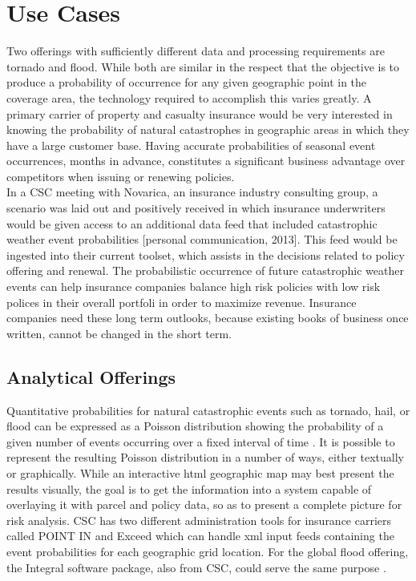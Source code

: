 \section{Use Cases}
Two offerings with sufficiently different data and processing requirements are tornado and flood. While both are similar in the respect that the objective is to produce a probability of occurrence for any given geographic point in the coverage area, the technology required to accomplish this varies greatly. A primary carrier of property and casualty insurance would be very interested in knowing the probability of natural catastrophes in geographic areas in which they have a large customer base. Having accurate probabilities of seasonal event occurrences, months in advance, constitutes a significant business advantage over competitors when issuing or renewing policies.\\

In a \textsc{CSC} meeting with Novarica, an insurance industry consulting group, a scenario was laid out and positively received in which insurance underwriters would be given access to an additional data feed that included catastrophic weather event probabilities [personal communication, 2013]. This feed would be ingested into their current toolset, which assists in the decisions related to policy offering and renewal. The probabilistic occurrence of future catastrophic weather events can help insurance companies balance high risk policies with low risk polices in their overall portfoli in order to maximize revenue. Insurance companies need these long term outlooks, because existing books of business once written, cannot be changed in the short term.
\subsection{Analytical Offerings}
Quantitative probabilities for natural catastrophic events such as tornado, hail, or flood can be expressed as a Poisson distribution showing the probability of a given number of events occurring over a fixed interval of time \cite{anderson}. It is possible to represent the resulting Poisson distribution in a number of ways, either textually or graphically. While an interactive \gls{html} geographic map may best present the results visually, the goal is to get the information into a system capable of overlaying it with parcel and policy data, so as to present a complete picture for risk analysis. \textsc{CSC} has two different administration tools for insurance carriers called POINT IN and Exceed which can handle \gls{xml} input feeds containing the event probabilities for each geographic grid location. For the global flood offering, the Integral software package, also from \textsc{CSC}, could serve the same purpose \cite{integral}. \\

